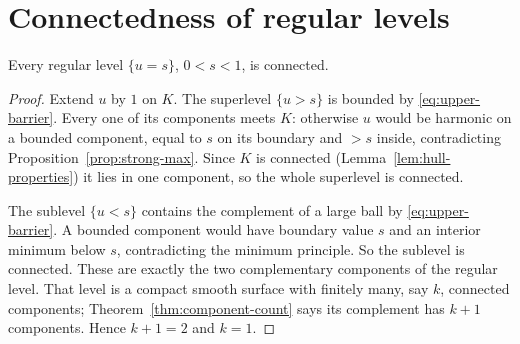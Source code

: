 \section{Connectedness of regular levels}

\begin{lemma}\label{lem:level-connected}
Every regular level $\{u=s\}$, $0<s<1$, is connected.
\end{lemma}

\begin{proof}
Extend $u$ by $1$ on $K$.  The superlevel $\{u>s\}$ is bounded by
\eqref{eq:upper-barrier}.  Every one of its components meets $K$: otherwise
$u$ would be harmonic on a bounded component, equal to $s$ on its boundary and
$>s$ inside, contradicting Proposition~\ref{prop:strong-max}.  Since $K$ is
connected (Lemma~\ref{lem:hull-properties}) it lies in one component, so the
whole superlevel is connected.

The sublevel $\{u<s\}$ contains the complement of a large ball by
\eqref{eq:upper-barrier}.  A bounded component would have boundary value $s$
and an interior minimum below $s$, contradicting the minimum principle.  So the
sublevel is connected.  These are exactly the two complementary components of
the regular level.  That level is a compact smooth surface with finitely many,
say $k$, connected components; Theorem~\ref{thm:component-count} says its
complement has $k+1$ components.  Hence $k+1=2$ and $k=1$.
\end{proof}

